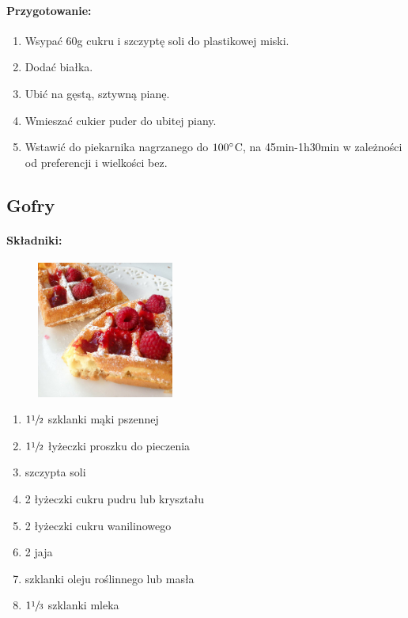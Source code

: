 \documentclass{article}
\begin{document}
    \paragraph{Przygotowanie:}
    \begin{enumerate}
        \item Wsypać 60g cukru i szczyptę soli do plastikowej miski.
        \item Dodać białka.
        \item Ubić na gęstą, sztywną pianę.
        \item Wmieszać cukier puder do ubitej piany.
        \item Wstawić do piekarnika nagrzanego do $100\degree$C, na
            45min-1h30min w zależności od preferencji i wielkości bez.
    \end{enumerate}
    \newpage


    \subsection{Gofry}
    \bigskip
    \paragraph{Składniki:}
    \begin{figure}
        \includegraphics[width=0.4\textwidth]{gofry.jpg}
    \end{figure}
    \begin{enumerate}
        \item $1\sfrac{1}{2}$ szklanki mąki pszennej
        \item $1\sfrac{1}{2}$ łyżeczki proszku do pieczenia
        \item szczypta soli
        \item 2 łyżeczki cukru pudru lub kryształu
        \item 2 łyżeczki cukru wanilinowego
        \item 2 jaja
        \item {} szklanki oleju roślinnego lub masła
        \item $1\sfrac{1}{3}$ szklanki mleka
    \end{enumerate}
\end{document}
